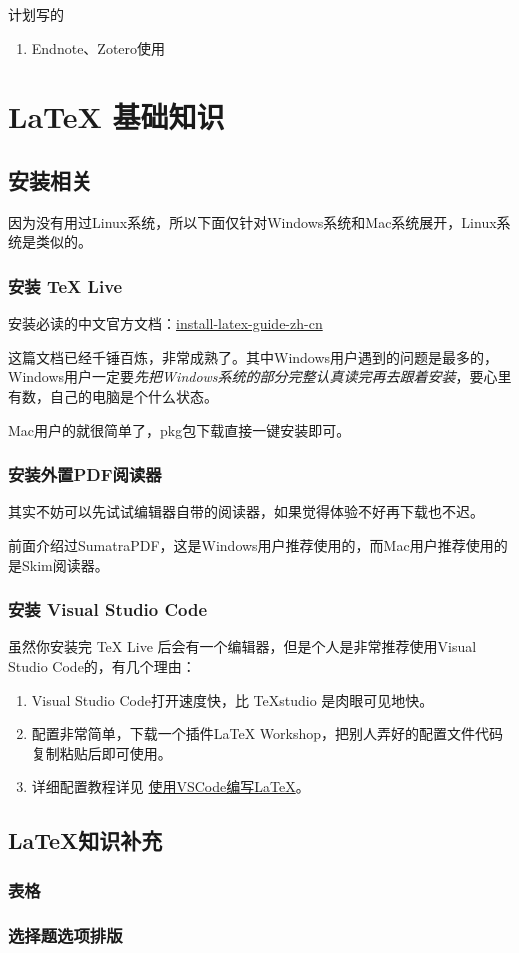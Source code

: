 计划写的
\begin{enumerate}
  \item Endnote、Zotero使用
\end{enumerate}

\section{ \LaTeX{} 基础知识}

\subsection{安装相关}
因为没有用过Linux系统，所以下面仅针对Windows系统和Mac系统展开，Linux系统是类似的。


\subsubsection{ 安装 \TeX{} Live }
安装必读的中文官方文档：\href{https://gitee.com/OsbertWang/install-latex-guide-zh-cn/releases}{install-latex-guide-zh-cn}

这篇文档已经千锤百炼，非常成熟了。其中Windows用户遇到的问题是最多的，Windows用户一定要\emph{先把Windows系统的部分完整认真读完再去跟着安装}，要心里有数，自己的电脑是个什么状态。

Mac用户的就很简单了，pkg包下载直接一键安装即可。


\subsubsection{ 安装外置PDF阅读器 }

其实不妨可以先试试编辑器自带的阅读器，如果觉得体验不好再下载也不迟。

前面介绍过SumatraPDF，这是Windows用户推荐使用的，而Mac用户推荐使用的是Skim阅读器。

\subsubsection{ 安装 Visual Studio Code }

虽然你安装完 \TeX{} Live 后会有一个编辑器，但是个人是非常推荐使用Visual Studio Code的，有几个理由：

\begin{enumerate}
  \item Visual Studio Code打开速度快，比 \TeX{}studio 是肉眼可见地快。
  \item 配置非常简单，下载一个插件LaTeX Workshop，把别人弄好的配置文件代码复制粘贴后即可使用。
  \item 详细配置教程详见 \href{https://zhuanlan.zhihu.com/p/38178015?utm_source=qq&utm_medium=social&utm_oi=1122597840500740096}{使用VSCode编写LaTeX}。
\end{enumerate}



\subsection{\LaTeX{}知识补充}

\subsubsection{表格}

\subsubsection{选择题选项排版}

